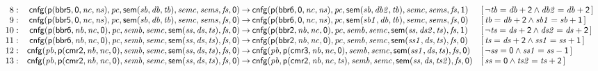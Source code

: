 \documentclass[a4paper]{article}
\newcommand{\symb}[1]{\mathsf{#1}}
\newcommand{\var}[1]{\mathit{#1}}
\newcommand{\Constraint}[1]{[\, #1 \,]}
\begin{document}
\begin{landscape}
\[\begin{array}{rr@{\>}c@{\>}ll}
\mathrm{8} : 
 & \symb{cnfg}(\symb{p}(\symb{bbr5},\symb{0},\var{nc},\var{ns}),\var{pc},\symb{sem}(\var{sb},\var{db},\var{tb}),\var{semc},\var{sems},\var{fs},\symb{0})
 & \to 
 & \symb{cnfg}(\symb{p}(\symb{bbr6},\symb{0},\var{nc},\var{ns}),\var{pc},\symb{sem}(\var{sb},\var{db2},\var{tb}),\var{semc},\var{sems},\var{fs},\symb{1})
 & \Constraint{\neg \var{tb} = \var{db} + \symb{2} \land \var{db2} = \var{db} + \symb{2}}\\

\mathrm{9} : 
 & \symb{cnfg}(\symb{p}(\symb{bbr5},\symb{0},\var{nc},\var{ns}),\var{pc},\symb{sem}(\var{sb},\var{db},\var{tb}),\var{semc},\var{sems},\var{fs},\symb{0})
 & \to 
 & \symb{cnfg}(\symb{p}(\symb{bbr6},\symb{0},\var{nc},\var{ns}),\var{pc},\symb{sem}(\var{sb1},\var{db},\var{tb}),\var{semc},\var{sems},\var{fs},\symb{0})
 & \Constraint{\var{tb} = \var{db} + \symb{2} \land \var{sb1} = \var{sb} + \symb{1}}\\

\mathrm{10} : 
 & \symb{cnfg}(\symb{p}(\symb{bbr6},\var{nb},\var{nc},\symb{0}),\var{pc},\var{semb},\var{semc},\symb{sem}(\var{ss},\var{ds},\var{ts}),\var{fs},\symb{0})
 & \to 
 & \symb{cnfg}(\symb{p}(\symb{bbr2},\var{nb},\var{nc},\symb{0}),\var{pc},\var{semb},\var{semc},\symb{sem}(\var{ss},\var{ds2},\var{ts}),\var{fs},\symb{1})
 & \Constraint{\neg \var{ts} = \var{ds} + \symb{2} \land \var{ds2} = \var{ds} + \symb{2}}\\

\mathrm{11} : 
 & \symb{cnfg}(\symb{p}(\symb{bbr6},\var{nb},\var{nc},\symb{0}),\var{pc},\var{semb},\var{semc},\symb{sem}(\var{ss},\var{ds},\var{ts}),\var{fs},\symb{0})
 & \to 
 & \symb{cnfg}(\symb{p}(\symb{bbr2},\var{nb},\var{nc},\symb{0}),\var{pc},\var{semb},\var{semc},\symb{sem}(\var{ss1},\var{ds},\var{ts}),\var{fs},\symb{0})
 & \Constraint{\var{ts} = \var{ds} + \symb{2} \land \var{ss1} = \var{ss} + \symb{1}}\\

\mathrm{12} : 
 & \symb{cnfg}(\var{pb},\symb{p}(\symb{cmr2},\var{nb},\var{nc},\symb{0}),\var{semb},\var{semc},\symb{sem}(\var{ss},\var{ds},\var{ts}),\var{fs},\symb{0})
 & \to 
 & \symb{cnfg}(\var{pb},\symb{p}(\symb{cmr3},\var{nb},\var{nc},\symb{0}),\var{semb},\var{semc},\symb{sem}(\var{ss1},\var{ds},\var{ts}),\var{fs},\symb{0})
 & \Constraint{\neg \var{ss} = \symb{0} \land \var{ss1} = \var{ss} - \symb{1}}\\

\mathrm{13} : 
 & \symb{cnfg}(\var{pb},\symb{p}(\symb{cmr2},\var{nb},\var{nc},\symb{0}),\var{semb},\var{semc},\symb{sem}(\var{ss},\var{ds},\var{ts}),\var{fs},\symb{0})
 & \to 
 & \symb{cnfg}(\var{pb},\symb{p}(\symb{cmr2},\var{nb},\var{nc},\var{ts}),\var{semb},\var{semc},\symb{sem}(\var{ss},\var{ds},\var{ts2}),\var{fs},\symb{0})
 & \Constraint{\var{ss} = \symb{0} \land \var{ts2} = \var{ts} + \symb{2}}\\


\end{array}\]
\end{landscape}
\end{document}
